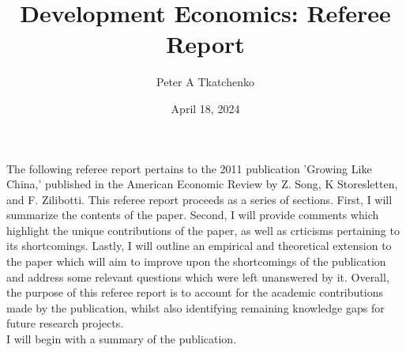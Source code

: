 \documentclass{article}
\title{Development Economics: Referee Report}
\author{Peter A Tkatchenko}
\date{April 18, 2024}
\begin{document}
\maketitle
The following referee report pertains to the 2011
publication 'Growing Like China,' published in the American
Economic Review by Z. Song, K Storesletten, and F. Zilibotti.
This referee report proceeds as a series of sections. First,
I will summarize the contents of the paper. Second, I will 
provide comments which highlight the unique contributions
of the paper, as well as crticisms pertaining to its shortcomings.
Lastly, I will outline an empirical and theoretical extension
to the paper which will aim to improve upon the shortcomings
of the publication and address some relevant questions which were left
unanswered by it. Overall, the purpose of this referee report 
is to account for the academic contributions made by the publication,
whilst also identifying remaining knowledge gaps for future research projects.
\\

I will begin with a summary of the publication. 
\end{document}
